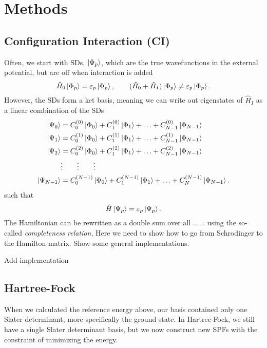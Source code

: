 \section{Methods} \label{sec:methods}

\subsection{Configuration Interaction (CI)}
Often, we start with SDs, $\ket{\Phi_p}$, which are the true wavefunctions in the external potential, but are off when interaction is added
\begin{equation}
\hat{H}_0\ket{\Phi_p}=\varepsilon_p\ket{\Phi_p},\qquad (\hat{H}_0+\hat{H}_I)\ket{\Phi_p}\neq\varepsilon_p\ket{\Phi_p}.
\end{equation}
However, the SDs form a ket basis, meaning we can write out eigenstates of $\hat{H}_I$ as a linear combination of the SDs
\begin{align}
\ket{\Psi_0}&=C_0^{(0)}\ket{\Phi_0}+C_1^{(0)}\ket{\Phi_1}+\hdots+C_{N-1}^{(0)}\ket{\Phi_{N-1}}\notag\\
\ket{\Psi_1}&=C_0^{(1)}\ket{\Phi_0}+C_1^{(1)}\ket{\Phi_1}+\hdots+C_{N-1}^{(1)}\ket{\Phi_{N-1}}\notag\\
\ket{\Psi_2}&=C_0^{(2)}\ket{\Phi_0}+C_1^{(2)}\ket{\Phi_1}+\hdots+C_{N-1}^{(2)}\ket{\Phi_{N-1}}\\
&\vdots\qquad\vdots\qquad\vdots\notag\\
\ket{\Psi_{N-1}}&=C_0^{(N-1)}\ket{\Phi_0}+C_1^{(N-1)}\ket{\Phi_1}+\hdots+C_N^{(N-1)}\ket{\Phi_{N-1}}.\notag
\end{align}
such that 
\begin{equation}
\hat{H}\ket{\Psi_p}=\varepsilon_p\ket{\Psi_p}.
\end{equation}
The Hamiltonian can be rewritten as a double sum over all ...... using the so-called \textit{completeness relation}, 
Here we need to show how to go from Schrodinger to the Hamilton matrix. Show some general implementations.

Add implementation

\subsection{Hartree-Fock}
When we calculated the reference energy above, our basis contained only one Slater determinant, more specifically the ground state. In Hartree-Fock, we still have a single Slater determinant basis, but we now construct new SPFs with the constraint of minimizing the energy. 

